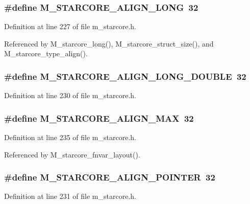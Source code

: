\subsubsection{\setlength{\rightskip}{0pt plus 5cm}\#define M\_\-STARCORE\_\-ALIGN\_\-LONG~32}\label{m__starcore_8h_b4376394ea69e29978565574ba0c0020}




Definition at line 227 of file m\_\-starcore.h.

Referenced by M\_\-starcore\_\-long(), M\_\-starcore\_\-struct\_\-size(), and M\_\-starcore\_\-type\_\-align().
\subsubsection{\setlength{\rightskip}{0pt plus 5cm}\#define M\_\-STARCORE\_\-ALIGN\_\-LONG\_\-DOUBLE~32}\label{m__starcore_8h_7d0edf82ac7d5ca3c0345bf3e25341a7}




Definition at line 230 of file m\_\-starcore.h.
\subsubsection{\setlength{\rightskip}{0pt plus 5cm}\#define M\_\-STARCORE\_\-ALIGN\_\-MAX~32}\label{m__starcore_8h_20f598b39dcb34db45454ab968522f51}




Definition at line 235 of file m\_\-starcore.h.

Referenced by M\_\-starcore\_\-fnvar\_\-layout().
\subsubsection{\setlength{\rightskip}{0pt plus 5cm}\#define M\_\-STARCORE\_\-ALIGN\_\-POINTER~32}\label{m__starcore_8h_abfa9afd044ef3f1d0f5e46fa2c89369}




Definition at line 231 of file m\_\-starcore.h.


